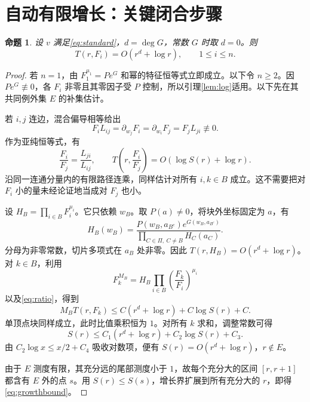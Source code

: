 \documentclass[UTF8,11pt,a4paper,fontset=fandol]{ctexart}
\newtheorem{proposition}[theorem]{命题}
\theoremstyle{definition}\newtheorem{definition}[theorem]{定义}
\theoremstyle{remark}\newtheorem{remark}[theorem]{注}
\begin{document}
\section{自动有限增长：关键闭合步骤}
\begin{proposition}\label{prop:growth}
设 $v$ 满足\eqref{eq:standard}，$d=\deg G$，常数 $G$ 时取 $d=0$。则
\begin{equation}\label{eq:growthbound}
T(r,F_i)=O(r^d+\log r),\qquad 1\le i\le n.
\end{equation}
\end{proposition}
\begin{proof}
若 $n=1$，由 $F_1^{\mu_1}=Pe^G$ 和幂的特征恒等式立即成立。以下令 $n\ge2$。因 $Pe^G\not\equiv0$，各 $F_i$ 非零且其零因子受 $P$ 控制，所以引理\ref{lem:log}适用。以下先在其共同例外集 $E$ 的补集估计。

若 $i,j$ 连边，混合偏导相等给出
\[
F_iL_{ij}=\partial_{w_j}F_i=\partial_{w_i}F_j=F_jL_{ji}\not\equiv0.
\]
作为亚纯恒等式，有
\begin{equation}\label{eq:ratio}
\frac{F_i}{F_j}=\frac{L_{ji}}{L_{ij}},\qquad
T\left(r,\frac{F_i}{F_j}\right)=O(\log S(r)+\log r).
\end{equation}
沿同一连通分量内的有限路径连乘，同样估计对所有 $i,k\in B$ 成立。这不需要把对 $F_i$ 小的量未经论证地当成对 $F_j$ 也小。

设 $H_B=\prod_{i\in B}F_i^{\mu_i}$。它只依赖 $w_B$。取 $P(a)\ne0$，将块外坐标固定为 $a$，有
\begin{equation}\label{eq:slice}
H_B(w_B)=\frac{P(w_B,a_{B^c})e^{G(w_B,a_{B^c})}}
{\prod_{C\in\Pi,\ C\ne B}H_C(a_C)}.
\end{equation}
分母为非零常数，切片多项式在 $a_B$ 处非零。因此 $T(r,H_B)=O(r^d+\log r)$。对 $k\in B$，利用
\begin{equation}\label{eq:identity}
F_k^{M_B}=H_B\prod_{i\in B}\left(\frac{F_k}{F_i}\right)^{\mu_i}
\end{equation}
以及\eqref{eq:ratio}，得到
\[
M_BT(r,F_k)\le C(r^d+\log r)+C\log S(r)+C.
\]
单顶点块同样成立，此时比值乘积恒为 $1$。对所有 $k$ 求和，调整常数可得
\begin{equation}\label{eq:closure}
S(r)\le C_1(r^d+\log r)+C_2\log S(r)+C_3.
\end{equation}
由 $C_2\log x\le x/2+C_4$ 吸收对数项，便有 $S(r)=O(r^d+\log r)$，$r\notin E$。

由于 $E$ 测度有限，其充分远的尾部测度小于 $1$，故每个充分大的区间 $[r,r+1]$ 都含有 $E$ 外的点 $s$。用 $S(r)\le S(s)$，增长界扩展到所有充分大的 $r$，即得\eqref{eq:growthbound}。
\end{proof}
\end{document}
